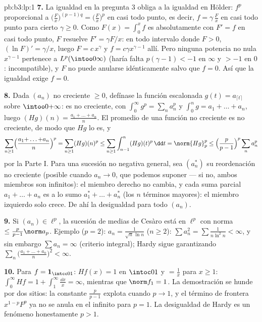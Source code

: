 \begin{solution}{pb:b3:lp:1}
\textbf{7.} La igualdad en la pregunta 3 obliga a la igualdad en Hölder:
$f^p$ proporcional a $\bigl(\frac Fx\bigr)^{(p-1)q}
= \bigl(\frac Fx\bigr)^p$ en casi todo punto, es decir,
$f = \gamma\,\frac Fx$ en casi todo punto para cierto $\gamma \geq 0$.
Como $F(x) = \int_0^xf$ es absolutamente
 con $F' = f$ en casi todo
punto, $F$ resuelve $F' =
\gamma F/x$: en todo intervalo donde $F > 0$, $(\ln F)' =
\gamma/x$, luego $F = c\,x^{\gamma}$ y $f = c\gamma
x^{\gamma - 1}$ allí. Pero ninguna potencia no nula $x^{\gamma-1}$
pertenece a $L^p(\intoo0\infty)$ (haría falta $p(\gamma - 1) < -1$ en
$\infty$ y $> -1$ en $0$: incompatible), y $F$ no puede anularse
idénticamente salvo que $f = 0$. Así que la igualdad exige $f =
0$.

\textbf{8.} Dada $(a_n)$ no creciente $\geq 0$, defínase la función
escalonada $g(t) = a_{\lceil t\rceil}$ sobre $\intoo0{+\infty}$: es no
creciente, con $\int_0^\infty g^p =
\sum_na_n^p$ y $\int_0^ng = a_1 + \dots + a_n$, luego
$(Hg)(n) = \frac{a_1 + \dots + a_n}n$. El promedio de una función no
creciente es no creciente, de modo que $Hg$ lo es, y
\[
\sum_{n\geq1}\Bigl(\frac{a_1{+}\dots{+}a_n}n\Bigr)^p
= \sum_{n\geq1}(Hg)(n)^p
\leq \sum_{n\geq1}\int_{n-1}^n (Hg)(t)^p\,\dd t
= \norm{Hg}_p^p
\leq \Bigl(\frac p{p-1}\Bigr)^p\sum_n a_n^p
\]
por la Parte I. Para una sucesión no negativa general, sea $(a_n^*)$ su
reordenación no creciente (posible cuando $a_n \to 0$, que podemos
suponer --- si no, ambos miembros son infinitos): el miembro derecho no
cambia, y cada suma parcial $a_1 + \dots
+ a_n$ es a lo sumo $a_1^* + \dots + a_n^*$ (los $n$ términos mayores):
el miembro izquierdo solo crece. De ahí la desigualdad para todo
$(a_n)$.

\textbf{9.} Si $(a_n) \in \ell^p$, la sucesión de medias de Cesàro está
en $\ell^p$ con norma $\leq \frac p{p-1}\norm
a_p$. Ejemplo ($p = 2$): $a_n = \frac1{\sqrt n\,\ln n}$ ($n
\geq 2$): $\sum a_n^2 = \sum\frac1{n\ln^2n} < \infty$, y sin embargo
$\sum a_n = \infty$ (criterio integral); Hardy sigue garantizando
$\sum_n\bigl(\frac{a_1 + \dots + a_n}n\bigr)^2 < \infty$.

\textbf{10.} Para $f = \mathbf 1_{\intcc01}$: $Hf(x) = 1$ en $\intoc01$
y $= \frac1x$ para $x \geq 1$: $\int_0^\infty Hf =
1 + \int_1^\infty\frac{\dd x}x = \infty$, mientras que $\norm f_1 =
1$. La demostración se hunde por dos sitios: la constante $\frac p{p-1}$
explota cuando $p \to 1$, y el término de frontera $x^{1-p}F^p$ ya no se
anula en el infinito para $p = 1$. La desigualdad de Hardy es un
fenómeno honestamente $p > 1$.


\end{solution}
